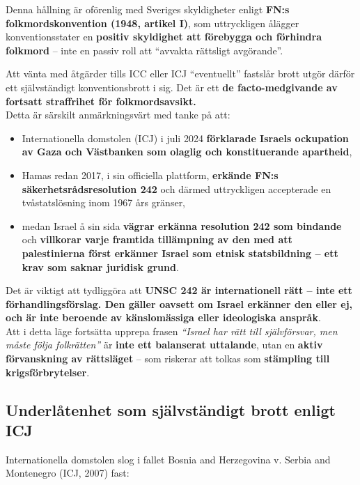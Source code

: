\noindent
Denna hållning är oförenlig med Sveriges skyldigheter enligt \textbf{FN:s folkmordskonvention (1948, artikel I)}, som uttryckligen ålägger konventionsstater en \textbf{positiv skyldighet att förebygga och förhindra folkmord} – inte en passiv roll att “avvakta rättsligt avgörande”.

\noindent
Att vänta med åtgärder tills ICC eller ICJ “eventuellt” fastslår brott utgör därför ett självständigt konventionsbrott i sig. Det är ett \textbf{de facto-medgivande av fortsatt straffrihet för folkmordsavsikt.}\\

\noindent
Detta är särskilt anmärkningsvärt med tanke på att:
\begin{itemize}
\item Internationella domstolen (ICJ) i juli 2024 \textbf{förklarade Israels ockupation av Gaza och Västbanken som olaglig och konstituerande apartheid},

\item Hamas redan 2017, i sin officiella plattform, \textbf{erkände FN:s säkerhetsrådsresolution 242} och därmed uttryckligen accepterade en tvåstatslösning inom 1967 års gränser,

\item medan Israel å sin sida \textbf{vägrar erkänna resolution 242 som bindande} och \textbf{villkorar varje framtida tillämpning av den med att palestinierna först erkänner Israel som etnisk statsbildning – ett krav som saknar juridisk grund}.
\end{itemize}

\noindent
Det är viktigt att tydliggöra att \textbf{UNSC 242 är internationell rätt – inte ett förhandlingsförslag. Den gäller oavsett om Israel erkänner den eller ej, och är inte beroende av känslomässiga eller ideologiska anspråk}.\\

 \noindent
Att i detta läge fortsätta upprepa frasen \textit{“Israel har rätt till självförsvar, men måste följa folkrätten”} är \textbf{inte ett balanserat uttalande}, utan en \textbf{aktiv förvanskning av rättsläget} – som riskerar att tolkas som \textbf{stämpling till krigsförbrytelser}.

\bigskip
\subsection*{Underlåtenhet som självständigt brott enligt ICJ}

Internationella domstolen slog i fallet Bosnia and Herzegovina v. Serbia and Montenegro (ICJ, 2007) fast:\\

